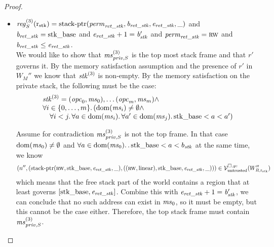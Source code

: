\begin{proof}
\begin{description}
\begin{itemize}
    \item $\reg_S^{(3)}(\rstk) = \stkptr{\perm_\var{ret\_\stk},\baddr_\var{ret\_\stk},\eaddr_\var{ret\_\stk},\_}$ and $\baddr_\var{ret\_\stk} = \stkb$ and $\eaddr_\var{ret\_\stk} +1 = \baddr_\stk' $ and $\perm_\var{ret\_\stk} = \rw$ and $\baddr_\var{ret\_\stk} \leq \eaddr_\var{ret\_\stk}$.
      \\
      We would like to show that $\ms_{\priv,S}^{(3)}$ is the top most stack frame and that $r'$ governs it.
      By the memory satisfaction assumption and the presence of $r'$ in $W_M''$ we know that $\stk^{(3)}$ is non-empty.
      By the memory satisfaction on the private stack, the following must be the case:
      \[
        \begin{array}{l}
          \stk^{(3)} = (\opc_0,\ms_0), \dots (\opc_m,\ms_m) \wedge \\
          \forall i \in \{0,\dots,m\} \ldotp (\dom(\ms_i) \neq \emptyset \wedge\\
          \quad \forall i < j \ldotp \forall a \in \dom(\ms_i) \ldotp \forall a' \in \dom(\ms_j) \ldotp \stkb < a < a')\\
        \end{array}
      \]

      Assume for contradiction $\ms_{\priv,S}^{(3)}$ is not the top frame. In that
      case $\dom(\ms_0) \neq \emptyset$ and $\forall a \in \dom(\ms_0) \ldotp
      \ldotp \stkb < a < b_\stk$ at the same time, we know
      \[
        \npair[n'']{(\stkptr{\rw,\stkb,\eaddr_\var{ret\_\stk},\_},((\rw,\linear),\stkb,\eaddr_\var{ret\_\stk},\_))}
        \in \lrv(W_{R,\rstk}'')
      \]
      which means that the free stack part of the world contains a region that at least governs $[\stkb,\eaddr_\var{ret\_\stk}]$.
      Combine this with $\eaddr_\var{ret\_\stk} +1 = \baddr_\stk' $, we can conclude that no such address can exist in $\ms_0$, so it must be empty, but this cannot be the case either.
      Therefore, the top stack frame must contain $\ms_{\priv,S}^{(3)}$.


\end{itemize}
\end{description}
\end{proof}
